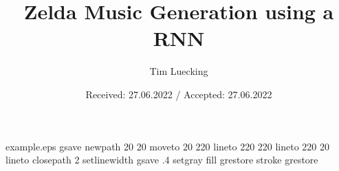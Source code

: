 %
%
%
%
%
\begin{filecontents*}{example.eps}
gsave
newpath
  20 20 moveto
  20 220 lineto
  220 220 lineto
  220 20 lineto
closepath
2 setlinewidth
gsave
  .4 setgray fill
grestore
stroke
grestore
\end{filecontents*}
%
\documentclass[twocolumn,fleqn,runningheads]{svjour2}
%
\smartqed  %
%
\usepackage{graphicx}
\usepackage{biograph} 
\usepackage{mwe}
\usepackage{subfig}       %
%
%
%
%
%


\title{Zelda Music Generation using a RNN%
}


\author{Tim Luecking}



\date{Received: 27.06.2022 / Accepted: 27.06.2022}


